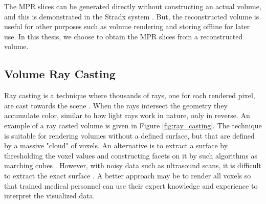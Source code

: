 	The MPR slices can be generated directly without constructing an actual volume, and this is demonstrated in the Stradx system \cite{prager1998}. But, the reconstructed volume is useful for other purposes such as volume rendering and storing offline for later use. In this thesis, we choose to obtain the MPR slices from a reconstructed volume.
	
	

\subsection{Volume Ray Casting}
	
	Ray casting is a technique where thousands of rays, one for each rendered pixel, are cast towards the scene \cite{preim2007, ludvigsen2010}. When the rays intersect the geometry they accumulate color, similar to how light rays work in nature, only in reverse. An example of a ray casted volume is given in Figure \ref{fig:ray_casting}. The technique is suitable for rendering volumes without a defined surface, but that are defined by a massive "cloud" of voxels. An alternative is to extract a surface by thresholding the voxel values and constructing facets on it by such algorithms as marching cubes \cite{lorensen1987}. However, with noisy data such as ultrasound scans, it is difficult to extract the exact surface \cite{sakas1995}. A better approach may be to render all voxels so that trained medical personnel can use their expert knowledge and experience to interpret the visualized data.
	
